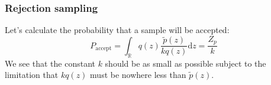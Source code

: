 \documentclass{beamer}
\begin{document}
\begin{frame}
    \frametitle{Rejection sampling}
    Let's calculate the probability that a sample will be accepted:
    \begin{equation*}
        P_{\textrm{accept}}=\int_{\mathbb{R}}q(z)\frac{\tilde{p}(z)}{kq(z)}\mathrm{d}z=\frac{Z_{p}}{k}
    \end{equation*}
    We see that the constant $k$ should be as small as possible subject to the limitation that $kq(z)$ must be nowhere less than $\tilde{p}(z)$.
\end{frame}
\end{document}
